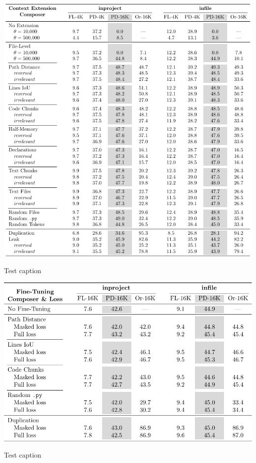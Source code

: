 \begin{table}[htbp]
    \centering
    \includegraphics[width=\textwidth]{tables/rq_b.pdf}
    \caption{Test caption}\label{tab:ocoder-extension}
\end{table}

\begin{table}[htbp]
    \centering
    \includegraphics[width=\textwidth]{tables/rq_a2_gradient_masking.pdf}
    \caption{Test caption}\label{tab:dseek-gradient-masking}
\end{table}

